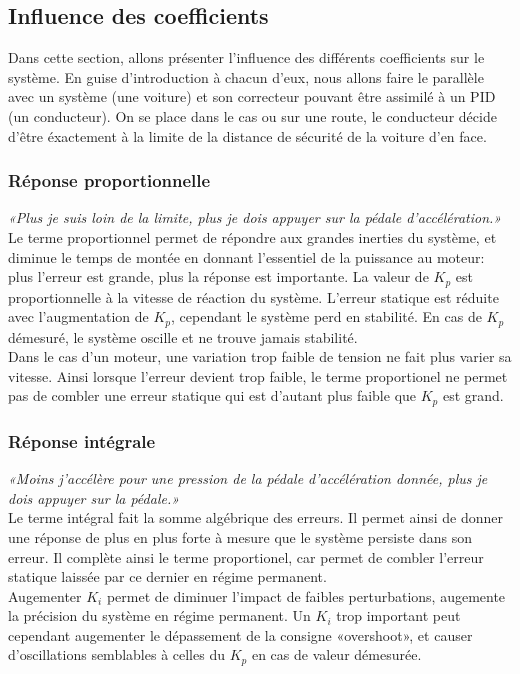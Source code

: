         \newpage
        \subsection{Influence des coefficients}
            Dans cette section, allons présenter l'influence des différents coefficients sur le système. En guise d'introduction à chacun d'eux, nous allons faire le parallèle avec un système (une voiture) et son correcteur pouvant être assimilé à un PID (un conducteur). On se place dans le cas ou sur une route, le conducteur décide d'être éxactement à la limite de la distance de sécurité de la voiture d'en face.

            \subsubsection{Réponse proportionnelle}
                \textit{«Plus je suis loin de la limite, plus je dois appuyer sur la pédale d'accélération.»}\\
                Le terme proportionnel permet de répondre aux grandes inerties du système, et diminue le temps de montée en donnant l'essentiel de la puissance au moteur: plus l'erreur est grande, plus la réponse est importante. La valeur de $K_p$ est proportionnelle à la vitesse de réaction du système. L'erreur statique est réduite avec l'augmentation de $K_p$, cependant le système perd en stabilité. En cas de $K_p$ démesuré, le système oscille et ne trouve jamais stabilité.\\
                Dans le cas d'un moteur, une variation trop faible de tension ne fait plus varier sa vitesse. Ainsi lorsque l'erreur devient trop faible, le terme proportionel ne permet pas de combler une erreur statique qui est d'autant plus faible que $K_p$ est grand.

            \subsubsection{Réponse intégrale}
                \textit{«Moins j'accélère pour une pression de la pédale d'accélération donnée, plus je dois appuyer sur la pédale.»}\\
                Le terme intégral fait la somme algébrique des erreurs. Il permet ainsi de donner une réponse de plus en plus forte à mesure que le système persiste dans son erreur. Il complète ainsi le terme proportionel, car permet de combler l'erreur statique laissée par ce dernier en régime permanent.\\
                Augementer $K_i$ permet de diminuer l'impact de faibles perturbations, augemente la précision du système en régime permanent. Un $K_i$ trop important peut cependant augementer le dépassement de la consigne «overshoot», et causer d'oscillations semblables à celles du $K_p$ en cas de valeur démesurée.

